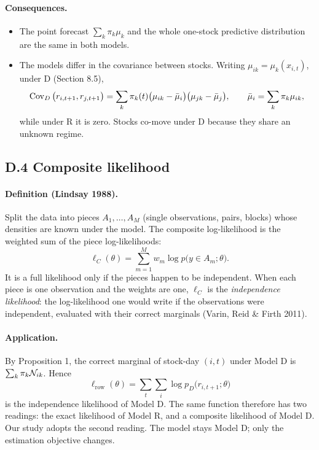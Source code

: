 \paragraph{Consequences.}
\begin{itemize}
  \item The point forecast $\sum_k\pi_k\mu_k$ and the whole one-stock predictive distribution are the same in both models.
  \item The models differ in the covariance between stocks. Writing $\mu_{ik}=\mu_k(x_{i,t})$, under D (Section 8.5),
  \begin{equation*}
  \operatorname{Cov}_D\big(r_{i,t+1},r_{j,t+1}\big)=\sum_k\pi_k(t)\big(\mu_{ik}-\bar\mu_i\big)\big(\mu_{jk}-\bar\mu_j\big),\qquad\bar\mu_i=\sum_k\pi_k\mu_{ik},
  \end{equation*}
  while under R it is zero. Stocks co-move under D because they share an unknown regime.
\end{itemize}

\subsection*{D.4 Composite likelihood}

\paragraph{Definition (Lindsay 1988).} Split the data into pieces $A_1,\dots,A_M$ (single observations, pairs, blocks) whose densities are known under the model. The composite log-likelihood is the weighted sum of the piece log-likelihoods:
\begin{equation*}
\ell_C(\theta)=\sum_{m=1}^M w_m\log p\big(y\in A_m;\theta\big).
\end{equation*}
It is a full likelihood only if the pieces happen to be independent. When each piece is one observation and the weights are one, $\ell_C$ is the \emph{independence likelihood}: the log-likelihood one would write if the observations were independent, evaluated with their correct marginals (Varin, Reid \& Firth 2011).

\paragraph{Application.} By Proposition 1, the correct marginal of stock-day $(i,t)$ under Model D is $\sum_k\pi_k\mathcal{N}_{ik}$. Hence
\begin{equation}
\ell_{\text{row}}(\theta)=\sum_t\sum_i\log p_D\big(r_{i,t+1};\theta\big)
\end{equation}
is the independence likelihood of Model D. The same function therefore has two readings: the exact likelihood of Model R, and a composite likelihood of Model D. Our study adopts the second reading. The model stays Model D; only the estimation objective changes.

